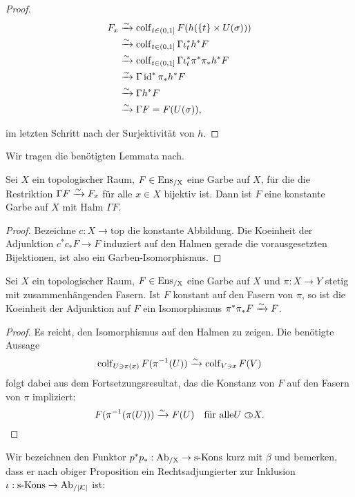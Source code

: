\begin{proof}
      \begin{align*}
      F_x &\xrightarrow{\sim} \operatorname{colf}\limits_{t \in (0, 1]} F(h(\{t\} \times U(\sigma))) \\
        &\xrightarrow{\sim} \operatorname{colf}\limits_{t \in (0, 1]} \Gamma \iota_t^* h^* F \\
        &\xrightarrow{\sim} \operatorname{colf}\limits_{t \in (0, 1]} \Gamma \iota_t^* \pi^* \pi_* h^* F \\
        &\xrightarrow{\sim} \Gamma \operatorname{id}^* \pi_* h^* F \\
        &\xrightarrow{\sim} \Gamma h^* F \\
        &\xrightarrow{\sim} \Gamma F = F(U(\sigma)),
      \end{align*}

        im letzten Schritt nach der Surjektivität von $h$.

\end{proof}

Wir tragen die benötigten Lemmata nach.

\begin{lemma}[\cite{TG}, 2.1.41]
  Sei $X$ ein topologischer Raum, $F \in \operatorname{Ens_{/X}}$ eine Garbe auf $X$,
  für die die Restriktion $\Gamma F \xrightarrow{\sim} F_x$ für alle $x \in X$
  bijektiv ist. Dann ist $F$ eine konstante Garbe auf $X$ mit Halm
  $\Gamma F$.
\end{lemma}
\begin{proof}
  Bezeichne $c: X \to \mathrm{top}$ die konstante Abbildung. Die
  Koeinheit der Adjunktion $c^* c_* F \to F$ induziert auf den Halmen
  gerade die vorausgesetzten Bijektionen, ist also ein
  Garben-Isomorphismus.
\end{proof}

\begin{lemma}
  Sei $X$ ein topologischer Raum, $F \in \operatorname{Ens_{/X}}$ eine Garbe auf $X$ und
  $\pi: X \to Y$ stetig mit zusammenhängenden Fasern. Ist $F$ konstant
  auf den Fasern von $\pi$, so ist die Koeinheit der Adjunktion auf
  $F$ ein Isomorphismus $\pi^* \pi_* F \xrightarrow{\sim} F$.
\end{lemma}
\begin{proof}
  Es reicht, den Isomorphismus auf den Halmen zu zeigen. Die benötigte
  Aussage
  \[ \operatorname{colf}\limits_{U \ni \pi(x)} F(\pi^{-1}(U))
  \xrightarrow{\sim} \operatorname{colf}\limits_{V \ni x} F(V) \]
  folgt dabei aus dem Fortsetzungsresultat, das die Konstanz von $F$
  auf den Fasern von $\pi$ impliziert:
  \[ F(\pi^{-1}(\pi(U))) \xrightarrow{\sim} F(U) \quad \text{für alle} U \subset\kern-0.58em\circ X. \]
\end{proof}

Wir bezeichnen den Funktor $p^*p_*: \operatorname{Ab_{/X}} \to \operatorname{s-Kons}$ kurz mit $\beta$
und bemerken, dass er nach obiger Proposition ein Rechtsadjungierter
zur Inklusion $\iota: \operatorname{s-Kons} \to \operatorname{Ab}_{/|\mathcal{K}|}$ ist:

